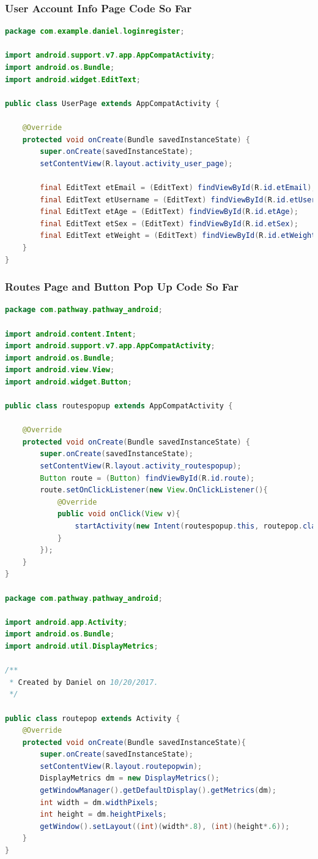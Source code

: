 ﻿\documentclass{article}
\begin{document}
\subsubsection{User Account Info Page Code So Far}
\begin{lstlisting}[language = Java]
package com.example.daniel.loginregister;

import android.support.v7.app.AppCompatActivity;
import android.os.Bundle;
import android.widget.EditText;

public class UserPage extends AppCompatActivity {

    @Override
    protected void onCreate(Bundle savedInstanceState) {
        super.onCreate(savedInstanceState);
        setContentView(R.layout.activity_user_page);

        final EditText etEmail = (EditText) findViewById(R.id.etEmail);
        final EditText etUsername = (EditText) findViewById(R.id.etUsername);
        final EditText etAge = (EditText) findViewById(R.id.etAge);
        final EditText etSex = (EditText) findViewById(R.id.etSex);
        final EditText etWeight = (EditText) findViewById(R.id.etWeight);
    }
}
\end{lstlisting}

\subsubsection{Routes Page and Button Pop Up Code So Far}
\begin{lstlisting}[language = Java]
package com.pathway.pathway_android;

import android.content.Intent;
import android.support.v7.app.AppCompatActivity;
import android.os.Bundle;
import android.view.View;
import android.widget.Button;

public class routespopup extends AppCompatActivity {

    @Override
    protected void onCreate(Bundle savedInstanceState) {
        super.onCreate(savedInstanceState);
        setContentView(R.layout.activity_routespopup);
        Button route = (Button) findViewById(R.id.route);
        route.setOnClickListener(new View.OnClickListener(){
            @Override
            public void onClick(View v){
                startActivity(new Intent(routespopup.this, routepop.class));
            }
        });
    }
}

package com.pathway.pathway_android;

import android.app.Activity;
import android.os.Bundle;
import android.util.DisplayMetrics;

/**
 * Created by Daniel on 10/20/2017.
 */

public class routepop extends Activity {
    @Override
    protected void onCreate(Bundle savedInstanceState){
        super.onCreate(savedInstanceState);
        setContentView(R.layout.routepopwin);
        DisplayMetrics dm = new DisplayMetrics();
        getWindowManager().getDefaultDisplay().getMetrics(dm);
        int width = dm.widthPixels;
        int height = dm.heightPixels;
        getWindow().setLayout((int)(width*.8), (int)(height*.6));
    }
}
\end{lstlisting}
\end{document}
